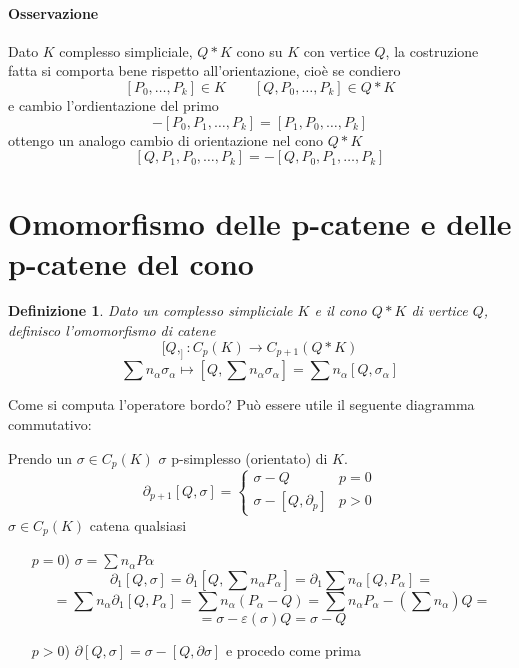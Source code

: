 \documentclass[a4paper]{report}
\newtheorem{definition}{Definizione}
\newcommand{\ra}{\ensuremath{\rightarrow}}
\begin{document}
\paragraph{Osservazione} Dato $K$ complesso simpliciale, $Q*K$ cono su $K$ con vertice $Q$, la costruzione fatta si comporta bene rispetto all'orientazione, cioè se condiero
\[
    [P_0,\dots,P_k]\in K\quad\quad[Q,P_0,\dots,P_k]\in Q*K
\]
e cambio l'ordientazione del primo
\[
    -[P_0,P_1,\dots,P_k]=[P_1,P_0,\dots,P_k]
\]
ottengo un analogo cambio di orientazione nel cono $Q*K$
\[
    [Q,P_1,P_0,\dots,P_k]=-[Q,P_0,P_1,\dots,P_k]
\]
\section{Omomorfismo delle p-catene e delle p-catene del cono}
\begin{definition}
    Dato un complesso simpliciale $K$ e il cono $Q*K$ di vertice $Q$, definisco l'omomorfismo di catene
    \[
        [Q,_]:C_p(K)\ra C_{p+1}(Q*K)
    \]
    \[
        \sum n_\alpha\sigma_\alpha\mapsto [Q,\sum n_\alpha\sigma_\alpha]=\sum n_\alpha[Q,\sigma_\alpha]
    \]
\end{definition}
Come si computa l'operatore bordo? Può essere utile il seguente diagramma commutativo:
\begin{center}
\end{center}
Prendo un $\sigma\in C_p(K)$ $\sigma$ p-simplesso (orientato) di $K$.
\[
    \partial_{p+1}[Q,\sigma]=\begin{cases}
        \sigma- Q             & p=0 \\
        \sigma-[Q,\partial_p] & p>0
    \end{cases}
\]
$\sigma\in C_p(K)$ catena qualsiasi
\begin{itemize}
    \item [$p=0$)] $\sigma=\sum n_\alpha P\alpha$
          \[
              \partial_1[Q,\sigma]=\partial_1[Q,\sum n_\alpha P_\alpha]=\partial_1\sum n_\alpha[Q,P_\alpha]=
          \]\[
              =\sum n_\alpha\partial_1[Q,P_\alpha]=\sum n_\alpha(P_\alpha-Q)=\sum n_\alpha P_\alpha-(\sum n_\alpha)Q=
          \]\[
              =\sigma-\varepsilon(\sigma)Q=\sigma-Q
          \]
    \item [$p>0$)] $\partial[Q,\sigma]=\sigma-[Q,\partial\sigma]$ e procedo come prima
\end{itemize}
\end{document}

